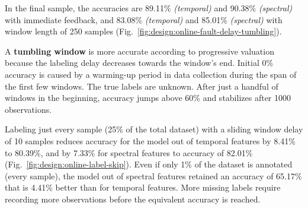 In the final sample, the accuracies are 89.11\% \emph{(temporal)} and 90.38\% \emph{(spectral)} with immediate feedback, and 83.08\% \emph{(temporal)} and 85.01\% \emph{(spectral)} with window length of 250 samples (Fig.~\ref{fig:design:online-fault-delay-tumbling}). 


A \textbf{tumbling window} is more accurate according to progressive valuation because the labeling delay decreases towards the window's end. Initial 0\% accuracy is caused by a warming-up period in data collection during the span of the first few windows. The true labels are unknown. After just a handful of windows in the beginning, accuracy jumps above 60\% and stabilizes after 1000 observations.


 
Labeling just every  sample (25\% of the total dataset) with a sliding window delay of 10 samples reduces accuracy for the model out of temporal features by 8.41\% to 80.39\%, and by 7.33\% for spectral features to accuracy of 82.01\% (Fig.~\ref{fig:design:online-label-skip}). Even if only 1\% of the dataset is annotated (every  sample), the model out of spectral features retained an accuracy of 65.17\% that is 4.41\% better than for temporal features.  More missing labels require recording more observations before the equivalent accuracy is reached.







